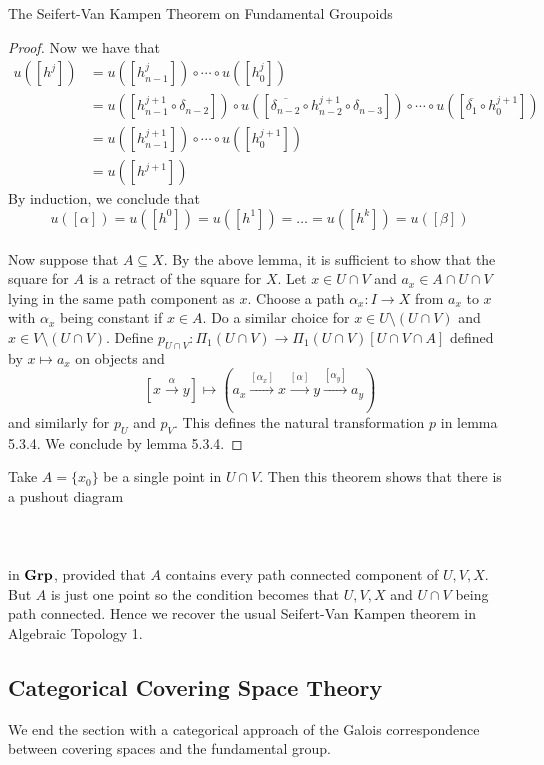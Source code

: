 \documentclass[a4paper]{article}
\begin{document}
\begin{thm}{The Seifert-Van Kampen Theorem on Fundamental Groupoids}{}
\begin{proof}
Now we have that 
\begin{align*}
u([h^j])&=u([h_{n-1}^j])\circ\cdots\circ u([h_0^j])\\
&=u([h_{n-1}^{j+1}\circ\delta_{n-2}])\circ u([\overline{\delta_{n-2}}\circ h_{n-2}^{j+1}\circ\delta_{n-3}])\circ\cdots\circ u([\overline{\delta_1}\circ h_0^{j+1}])\\
&=u([h_{n-1}^{j+1}])\circ\cdots\circ u([h_0^{j+1}])\\
&=u([h^{j+1}])
\end{align*}
By induction, we conclude that $$u([\alpha])=u([h^0])=u([h^1])=\dots=u([h^k])=u([\beta])$$~\\

Now suppose that $A\subseteq X$. By the above lemma, it is sufficient to show that the square for $A$ is a retract of the square for $X$. Let $x\in U\cap V$ and $a_x\in A\cap U\cap V$ lying in the same path component as $x$. Choose a path $\alpha_x:I\to X$ from $a_x$ to $x$ with $\alpha_x$ being constant if $x\in A$. Do a similar choice for $x\in U\setminus(U\cap V)$ and $x\in V\setminus(U\cap V)$. Define $p_{U\cap V}:\Pi_1(U\cap V)\to\Pi_1(U\cap V)[U\cap V\cap A]$ defined by $x\mapsto a_x$ on objects and $$[x\overset{\alpha}{\to} y]\mapsto\left(a_x\overset{[\alpha_x]}{\to}x\overset{[\alpha]}{\to}y\overset{[\alpha_y]}{\to}a_y\right)$$ and similarly for $p_U$ and $p_V$. This defines the natural transformation $p$ in lemma 5.3.4. We conclude by lemma 5.3.4. 
\end{proof}
\end{thm}

Take $A=\{x_0\}$ be a single point in $U\cap V$. Then this theorem shows that there is a pushout diagram \\~\\
\\~\\
in $\bold{Grp}$, provided that $A$ contains every path connected component of $U,V,X$. But $A$ is just one point so the condition becomes that $U,V,X$ and $U\cap V$ being path connected. Hence we recover the usual Seifert-Van Kampen theorem in Algebraic Topology 1. 

\subsection{Categorical Covering Space Theory}
We end the section with a categorical approach of the Galois correspondence between covering spaces and the fundamental group. 
\end{document}
